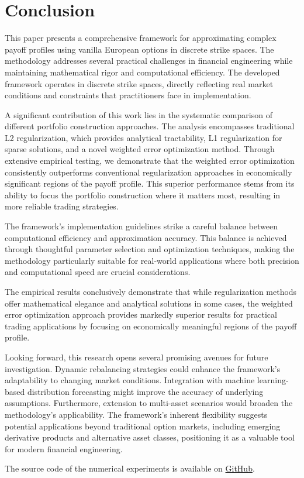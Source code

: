 \documentclass[12pt]{article}
\begin{document}
\section{Conclusion}
This paper presents a comprehensive framework for approximating complex payoff profiles using vanilla European options in discrete strike spaces. The methodology addresses several practical challenges in financial engineering while maintaining mathematical rigor and computational efficiency. The developed framework operates in discrete strike spaces, directly reflecting real market conditions and constraints that practitioners face in implementation.

A significant contribution of this work lies in the systematic comparison of different portfolio construction approaches. The analysis encompasses traditional L2 regularization, which provides analytical tractability, L1 regularization for sparse solutions, and a novel weighted error optimization method. Through extensive empirical testing, we demonstrate that the weighted error optimization consistently outperforms conventional regularization approaches in economically significant regions of the payoff profile. This superior performance stems from its ability to focus the portfolio construction where it matters most, resulting in more reliable trading strategies.

The framework's implementation guidelines strike a careful balance between computational efficiency and approximation accuracy. This balance is achieved through thoughtful parameter selection and optimization techniques, making the methodology particularly suitable for real-world applications where both precision and computational speed are crucial considerations.

The empirical results conclusively demonstrate that while regularization methods offer mathematical elegance and analytical solutions in some cases, the weighted error optimization approach provides markedly superior results for practical trading applications by focusing on economically meaningful regions of the payoff profile.

Looking forward, this research opens several promising avenues for future investigation. Dynamic rebalancing strategies could enhance the framework's adaptability to changing market conditions. Integration with machine learning-based distribution forecasting might improve the accuracy of underlying assumptions. Furthermore, extension to multi-asset scenarios would broaden the methodology's applicability. The framework's inherent flexibility suggests potential applications beyond traditional option markets, including emerging derivative products and alternative asset classes, positioning it as a valuable tool for modern financial engineering.

The source code of the numerical experiments is available on \href{https://github.com/VladKochetov007/payoff_approximation}{GitHub}.



\end{document}

